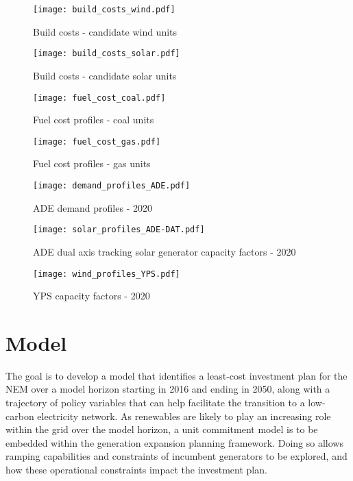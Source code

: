 \documentclass{article}
\begin{document}
\begin{figure}
	\texttt{[image: build\_costs\_wind.pdf]}
	\caption{Build costs - candidate wind units}
\end{figure}

\begin{figure}
	\texttt{[image: build\_costs\_solar.pdf]}
	\caption{Build costs - candidate solar units}
\end{figure}

\begin{figure}
	\texttt{[image: fuel\_cost\_coal.pdf]}
	\caption{Fuel cost profiles - coal units}
\end{figure}

\begin{figure}
	\texttt{[image: fuel\_cost\_gas.pdf]}
	\caption{Fuel cost profiles - gas units}
\end{figure}

\begin{figure}
	\texttt{[image: demand\_profiles\_ADE.pdf]}
	\caption{ADE demand profiles - 2020}
\end{figure}

\begin{figure}
	\texttt{[image: solar\_profiles\_ADE-DAT.pdf]}
	\caption{ADE dual axis tracking solar generator capacity factors - 2020}
\end{figure}

\begin{figure}
	\texttt{[image: wind\_profiles\_YPS.pdf]}
	\caption{YPS capacity factors - 2020}
\end{figure}


\section{Model}
The goal is to develop a model that identifies a least-cost investment plan for the NEM over a model horizon starting in 2016 and ending in 2050, along with a trajectory of policy variables that can help facilitate the transition to a low-carbon electricity network. As renewables are likely to play an increasing role within the grid over the model horizon, a unit commitment model is to be embedded within the generation expansion planning framework. Doing so allows ramping capabilities and constraints of incumbent generators to be explored, and how these operational constraints impact the investment plan. 
\end{document}
